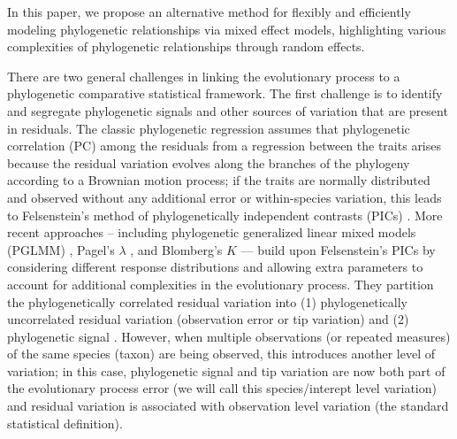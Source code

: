 In this paper, we propose an alternative method for flexibly and efficiently modeling phylogenetic relationships via mixed effect models, highlighting various complexities of phylogenetic relationships through random effects.

There are two general challenges in linking the evolutionary process to a phylogenetic comparative statistical framework.
The first challenge is to identify and segregate phylogenetic signals \citep{blomberg2003testing} and other sources of variation that are present in residuals.  
The classic phylogenetic regression assumes that phylogenetic correlation (PC) among the residuals from a regression between the traits arises because the residual variation evolves along the branches of the phylogeny according to a Brownian motion process; if the traits are normally distributed and observed without any additional error or within-species variation, this leads to Felsenstein's method of phylogenetically independent contrasts (PICs) \citep{felsenstein1985phylogenies}.
More recent approaches -- including phylogenetic generalized linear mixed models (PGLMM) \citep{ives2011generalized}, Pagel's $\lambda$ \citep{pagel1999inferring}, and Blomberg's $K$ \citep{blomberg2003testing} --- build upon Felsenstein's PICs by considering different response distributions and allowing extra parameters to account for additional complexities in the evolutionary process. They partition the phylogenetically correlated residual variation into (1) phylogenetically uncorrelated residual variation (observation error or tip variation) and (2) phylogenetic signal  \citep[biological/evolutionary process error:][]{hansen2012interpreting}.
However, when multiple observations (or repeated measures) of the same species (taxon) are being observed, this introduces another level of variation; in this case, phylogenetic signal and tip variation are now both part of the evolutionary process error (we will call this species/interept level variation) and residual variation is associated with observation level variation (the standard statistical definition).
